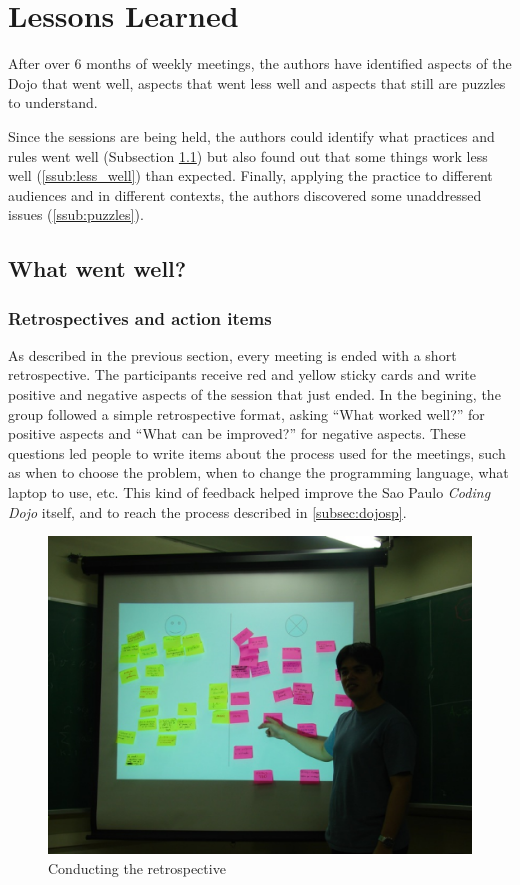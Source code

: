 \section{Lessons Learned}\label{sec:lessons_learned}

After over 6 months of weekly meetings, the authors have identified
aspects of the Dojo that went well, aspects that went less well and
aspects that still are puzzles to understand.

Since the sessions are being held, the authors could identify what
practices and rules went well (Subsection \ref{ssub:well}) but also
found out that some things work less well (\ref{ssub:less_well}) than
expected. Finally, applying the practice to different audiences and in
different contexts, the authors discovered some unaddressed issues
(\ref{ssub:puzzles}).

\subsection{What went well?}\label{ssub:well}

\subsubsection{Retrospectives and action items}

As described in the previous section, every meeting is ended with a
short retrospective. The participants receive red and yellow sticky
cards and write positive and negative aspects of the session that just
ended. In the begining, the group followed a simple retrospective
format, asking ``What worked well?'' for positive aspects and ``What
can be improved?'' for negative aspects. These questions led people to
write items about the process used for the meetings, such as when to
choose the problem, when to change the programming language, what
laptop to use, etc. This kind of feedback helped improve the Sao Paulo
\emph{Coding Dojo} itself, and to reach the process described in
\ref{subsec:dojosp}.

\begin{figure}[htp]
\centering
\includegraphics[width=\columnwidth]{retrospective}
\caption{Conducting the retrospective}\label{fig:retrospective}
\end{figure}

